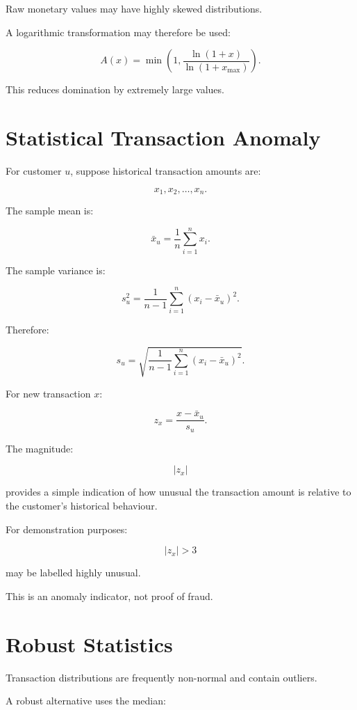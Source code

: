 \documentclass[11pt,a4paper]{article}
\begin{document}
Raw monetary values may have highly skewed distributions.

A logarithmic transformation may therefore be used:

\[
A(x)
=
\min
\left(
1,
\frac{\ln(1+x)}
{\ln(1+x_{\max})}
\right).
\]

This reduces domination by extremely large values.

\section{Statistical Transaction Anomaly}

For customer \(u\), suppose historical transaction amounts are:

\[
x_1,x_2,\ldots,x_n.
\]

The sample mean is:

\[
\bar{x}_u
=
\frac{1}{n}
\sum_{i=1}^{n}x_i.
\]

The sample variance is:

\[
s_u^2
=
\frac{1}{n-1}
\sum_{i=1}^{n}
(x_i-\bar{x}_u)^2.
\]

Therefore:

\[
s_u
=
\sqrt{
\frac{1}{n-1}
\sum_{i=1}^{n}
(x_i-\bar{x}_u)^2
}.
\]

For new transaction \(x\):

\[
z_x
=
\frac{x-\bar{x}_u}{s_u}.
\]

The magnitude:

\[
|z_x|
\]

provides a simple indication of how unusual the transaction amount is
relative to the customer's historical behaviour.

For demonstration purposes:

\[
|z_x|>3
\]

may be labelled highly unusual.

This is an anomaly indicator, not proof of fraud.

\section{Robust Statistics}

Transaction distributions are frequently non-normal and contain
outliers.

A robust alternative uses the median:
\end{document}
